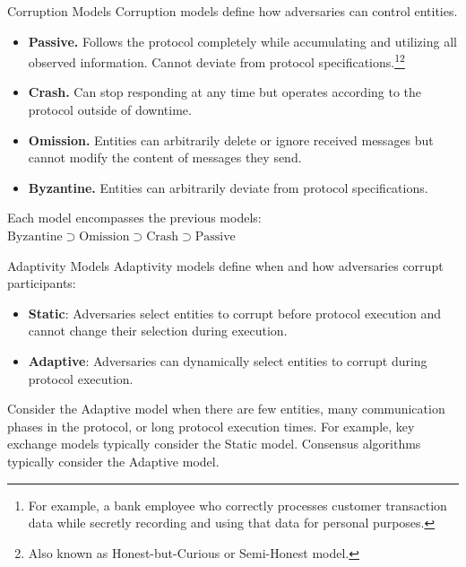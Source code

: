 \documentclass[aspectratio=169,10pt]{beamer}
\newenvironment{outlineblock}[1][]
{\begin{tcolorbox}[colframe=black, colback=white, boxrule=1pt, boxsep=5pt]}
{\end{tcolorbox}}
\begin{document}
\begin{frame}{Corruption Models}
Corruption models define how adversaries can control entities.

\vspace{0.5em}

\begin{itemize}
    \item \textbf{Passive. }Follows the protocol completely while accumulating and utilizing all observed information. Cannot deviate from protocol specifications.\footnote{For example, a bank employee who correctly processes customer transaction data while secretly recording and using that data for personal purposes.}\footnote{Also known as Honest-but-Curious or Semi-Honest model.}
    
    \item \textbf{Crash. }Can stop responding at any time but operates according to the protocol outside of downtime.
    
    \item \textbf{Omission. }Entities can arbitrarily delete or ignore received messages but cannot modify the content of messages they send.
    
    \item \textbf{Byzantine. }Entities can arbitrarily deviate from protocol specifications.
\end{itemize}

\vspace{0.5em}

\begin{outlineblock}[]
Each model encompasses the previous models: $\text{Byzantine} \supset \text{Omission} \supset \text{Crash} \supset \text{Passive}$
\end{outlineblock}

\end{frame}

\begin{frame}{Adaptivity Models}
Adaptivity models define when and how adversaries corrupt participants:

\vspace{0.5em}

\begin{itemize}
    \item \textbf{Static}: Adversaries select entities to corrupt before protocol execution and cannot change their selection during execution.
    
    \item \textbf{Adaptive}: Adversaries can dynamically select entities to corrupt during protocol execution.
\end{itemize}

\vspace{0.5em}

\begin{outlineblock}[]
Consider the Adaptive model when there are few entities, many communication phases in the protocol, or long protocol execution times.
For example, key exchange models typically consider the Static model.
Consensus algorithms typically consider the Adaptive model.
\end{outlineblock}
\end{frame}
\end{document}
